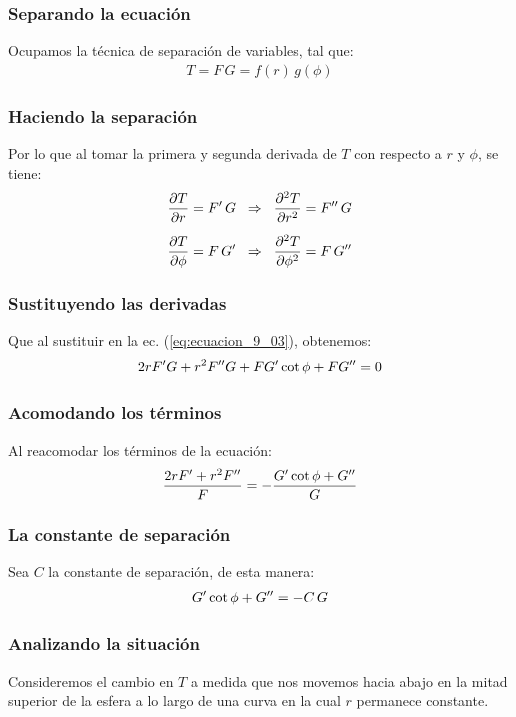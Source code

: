 \documentclass[12pt]{beamer}
\begin{document}
\begin{frame}
\frametitle{Separando la ecuación}
Ocupamos la técnica de separación de variables, tal que:
\pause
\begin{align}
T = F \, G = f(r) \, g(\phi)
\label{eq:ecuacion_9_04}
\end{align}
\end{frame}
\begin{frame}
\frametitle{Haciendo la separación}
Por lo que al tomar la primera y segunda derivada de $T$ con respecto a $r$ y $\phi$, se tiene:
\pause
\begin{align}
\pdv{T}{r} &= {F}^{\prime} \, G \hspace{0.2cm} \Rightarrow \hspace{0.2cm} \pdv[2]{T}{r} = {F}^{\prime \prime} \, G \label{eq:ecuacion_9_05} \\[0.5em]
\pdv{T}{\phi} &= F \, {G}^{\prime} \hspace{0.2cm} \Rightarrow \hspace{0.2cm} \pdv[2]{T}{\phi} = F \, {G}^{\prime \prime} \label{eq:ecuacion_9_06} 
\end{align}
\end{frame}
\begin{frame}
\frametitle{Sustituyendo las derivadas}
Que al sustituir en la ec. (\ref{eq:ecuacion_9_03}), obtenemos:
\pause
\begin{align}
2 r {F}^{\prime} G + r^{2} {F}^{\prime \prime} G + F {G}^{\prime} \cot \phi + F {G}^{\prime \prime} = 0
\label{eq:ecuacion_9_07}
\end{align}
\end{frame}
\begin{frame}
\frametitle{Acomodando los términos}
Al reacomodar los términos de la ecuación:
\pause
\begin{align}
\dfrac{2 r {F}^{\prime} + r^{2} {F}^{\prime \prime}}{F} = - \dfrac{{G}^{\prime} \cot \phi + {G}^{\prime \prime}}{G}
\label{eq:ecuacion_9_08}
\end{align}
\end{frame}
\begin{frame}
\frametitle{La constante de separación}
Sea $C$ la constante de separación, de esta manera:
\pause
\begin{align}
{G}^{\prime} \cot \phi + {G}^{\prime \prime} = - C \, G
\label{eq:ecuacion_9_09}
\end{align}
\end{frame}
\begin{frame}
\frametitle{Analizando la situación}
Consideremos el cambio en $T$ a medida que nos movemos hacia abajo en la mitad superior de la esfera a lo largo de una curva en la cual $r$ permanece constante.
\end{frame}
\end{document}
